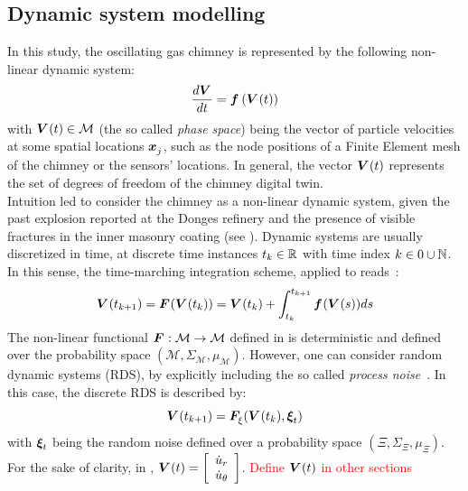 \documentclass[runningheads]{llncs}
\begin{document}
\subsection{Dynamic system modelling}
\label{sec:dynSystemModelling}
In this study, the oscillating gas chimney is represented by the following non-linear dynamic system:
\begin{equation}
    \matd[\Vv]=\fv\pdp{\Vv(t)}
    \label{eq:nonlinear_dynamics}
\end{equation}
with $\Vv(t)\in \mathcal{M}$ (the so called \textit{phase space}) being the vector of particle velocities at some spatial locations $\xv[j]$, such as the node positions of a Finite Element mesh of the chimney or the sensors' locations. In general, the vector $\Vv(t)$ represents the set of degrees of freedom of the chimney digital twin.\\ Intuition led to consider the chimney as a non-linear dynamic system, given the past explosion reported at the Donges refinery and the presence of visible fractures in the inner masonry coating (see ). Dynamic systems are usually discretized in time, at discrete time instances $t_k \in \mathbb{R}$ with time index $k\in {0} \cup \mathbb{N}$. In this sense, the time-marching integration scheme, applied to  reads~\cite{brunton_chaos_2017}:
\begin{equation}
    \Vv(t_{k+1})=\Fv(\Vv(t_{k}))=\Vv(t_{k})+\int_{t_k}^{t_{k+1}} \fv(\Vv(s)) ds
    \label{eq:nonlinear_dynamics_discrete}
\end{equation}
The non-linear functional $\Fv:\mathcal{M}\to\mathcal{M}$ defined in  is deterministic and defined over the probability space $(\mathcal{M},\Sigma_\mathcal{M},\mu_\mathcal{M})$. However, one can consider random dynamic systems (RDS), by explicitly including the so called \textit{process noise}~\cite{takeishi_subspace_2017}. In this case, the discrete RDS is described by:
\begin{equation}
    \Vv(t_{k+1})=\Fv[\xi](\Vv(t_{k}),\xiv[t])
    \label{eq:RDS}
\end{equation}
with $\xiv[t]$ being the random noise defined over a probability space $(\Xi,\Sigma_\Xi,\mu_\Xi)$.\\ For the sake of clarity, in , $\Vv(t)=\bmat[\dot u_r\\ \dot u_\theta][c]$. \textcolor{red}{Define $\Vv(t)$ in other sections}
\end{document}
